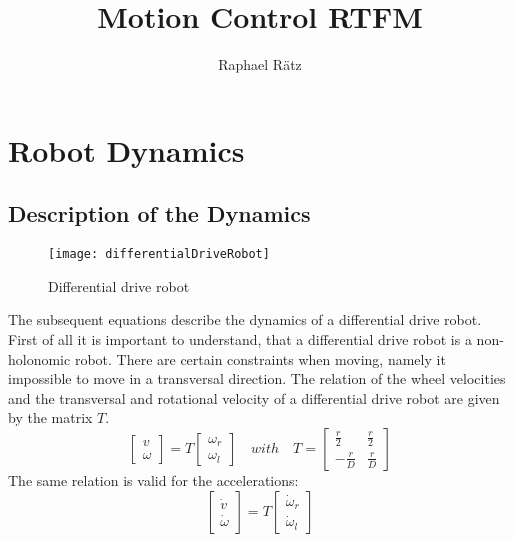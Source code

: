 \documentclass[a4paper, 11pt]{article}
\begin{document}
	
\begin{titlepage}
	
\title{\Huge Motion Control RTFM}
\author{\Large Raphael Rätz}
\maketitle
\end{titlepage}

	



\section{Robot Dynamics}
\subsection{Description of the Dynamics}
\begin{figure}[H]
	\centering
	\texttt{[image: differentialDriveRobot]}
	\caption{Differential drive robot}	
	\label{fig:differentialDriveRobot}	
\end{figure}
\noindent
The subsequent equations describe the dynamics of a differential drive robot. First of all it is important to understand, that a differential drive robot is a non-holonomic robot. There are certain constraints when moving, namely it impossible to move in a transversal direction. The relation of the wheel velocities and the transversal and rotational velocity of a differential drive robot are given by the matrix $T$.
\begin{equation}
	\begin{bmatrix}
	v\\
	\omega
	\end{bmatrix}
	= T
	\begin{bmatrix}
	\omega_r\\
	\omega_l
	\end{bmatrix}
	\quad with \quad
	T = 
	\begin{bmatrix}
	\frac{r}{2} &\frac{r}{2}\\[4pt] 
	-\frac{r}{D} &\frac{r}{D}
	\end{bmatrix}
\end{equation}
The same relation is valid for the accelerations:
\begin{equation}
\begin{bmatrix}
\dot{v}\\
\dot{\omega}
\end{bmatrix}
= T
\begin{bmatrix}
\dot{\omega}_r\\
\dot{\omega}_l
\end{bmatrix}
\end{equation}
\end{document}
